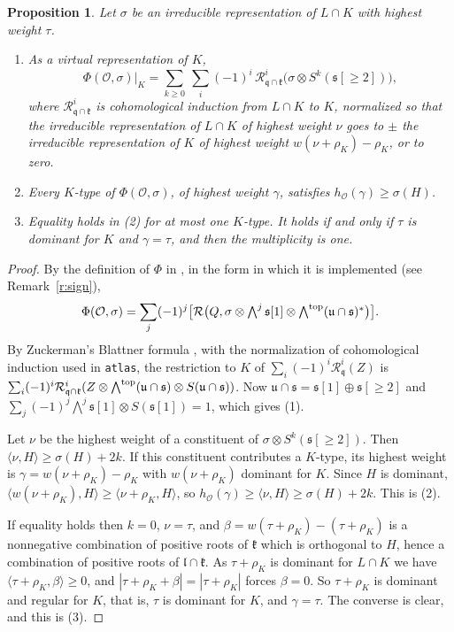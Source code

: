 \documentclass[11pt,leqno]{article}
\newtheorem{proposition}[equation]{Proposition}
\theoremstyle{definition}
\numberwithin{equation}{section}
\newcommand{\Ob}{\mathcal O}
\newcommand{\fk}{\mathfrak k}
\newcommand{\fs}{\mathfrak s}
\newcommand{\fq}{\mathfrak q}
\newcommand{\fu}{\mathfrak u}
\newcommand{\fl}{\mathfrak l}
\newcommand{\at}[1]{\texttt{#1}}
\begin{document}
\begin{proposition}
\label{p:cone}
Let $\sigma$ be an irreducible representation of $L\cap K$ with highest
weight $\tau$.
\begin{enumerate}
\item As a virtual representation of $K$,
\[
\Phi(\Ob,\sigma)|_K=\sum_{k\ge 0}\ \sum_i(-1)^i\,
\mathcal R^i_{\fq\cap\fk}\big(\sigma\otimes S^k(\fs[\ge 2])\big),
\]
where $\mathcal R^i_{\fq\cap\fk}$ is cohomological induction from $L\cap K$ to
$K$, normalized so that the irreducible representation of $L\cap K$ of
highest weight $\nu$ goes to $\pm$ the irreducible representation of $K$ of
highest weight $w(\nu+\rho_K)-\rho_K$, or to zero.
\item Every $K$-type of $\Phi(\Ob,\sigma)$, of highest weight $\gamma$,
satisfies $h_\Ob(\gamma)\ge\sigma(H)$.
\item Equality holds in (2) for at most one $K$-type.  It holds if and only
if $\tau$ is dominant for $K$ and $\gamma=\tau$, and then the multiplicity is
one.
\end{enumerate}
\end{proposition}

\begin{proof}
By the definition of $\Phi$ in \cite[Section~6]{KN}, in the form in which it is implemented (see Remark~\ref{r:sign}),
\[
\Phi(\Ob,\sigma)=\sum_j(-1)^j\big[\mathcal R\big(Q,\sigma\otimes
\textstyle\bigwedge^j\fs[1]\otimes\bigwedge^{\rm top}(\fu\cap\fs)^*\big)\big].
\]
By Zuckerman's Blattner formula \cite[Proposition~11.7]{AV}, with the
normalization of cohomological induction used in \at{atlas}, the restriction
to $K$ of $\sum_i(-1)^i\mathcal R^i_\fq(Z)$ is
$\sum_i(-1)^i\mathcal R^i_{\fq\cap\fk}(Z\otimes\bigwedge^{\rm
top}(\fu\cap\fs)\otimes S(\fu\cap\fs))$.  Now
$\fu\cap\fs=\fs[1]\oplus\fs[\ge 2]$ and
$\sum_j(-1)^j\bigwedge^j\fs[1]\otimes S(\fs[1])=1$, which gives (1).

Let $\nu$ be the highest weight of a constituent of
$\sigma\otimes S^k(\fs[\ge 2])$.  Then $\langle\nu,H\rangle\ge\sigma(H)+2k$.
If this constituent contributes a $K$-type, its highest weight is
$\gamma=w(\nu+\rho_K)-\rho_K$ with $w(\nu+\rho_K)$ dominant for $K$.  Since
$H$ is dominant, $\langle w(\nu+\rho_K),H\rangle\ge\langle\nu+\rho_K,H\rangle$,
so $h_\Ob(\gamma)\ge\langle\nu,H\rangle\ge\sigma(H)+2k$.  This is (2).

If equality holds then $k=0$, $\nu=\tau$, and
$\beta=w(\tau+\rho_K)-(\tau+\rho_K)$ is a nonnegative combination of positive
roots of $\fk$ which is orthogonal to $H$, hence a combination of positive
roots of $\fl\cap\fk$.  As $\tau+\rho_K$ is dominant for $L\cap K$ we have
$\langle\tau+\rho_K,\beta\rangle\ge 0$, and
$|\tau+\rho_K+\beta|=|\tau+\rho_K|$ forces $\beta=0$.  So $\tau+\rho_K$ is
dominant and regular for $K$, that is, $\tau$ is dominant for $K$, and
$\gamma=\tau$.  The converse is clear, and this is (3).
\end{proof}
\end{document}
